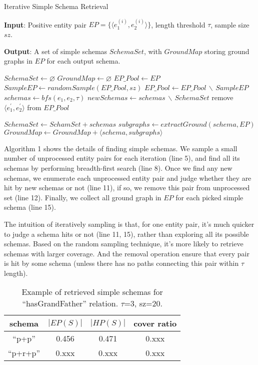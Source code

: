 \begin{algorithm}
\caption{Iterative Simple Schema Retrieval}
\label{alg:bfs}
\textbf{Input}: Positive entity pair $EP=\{\langle e_1^{(i)}, e_2^{(i)} \rangle\}$,
length threshold $\tau$, sample size $sz$.

\textbf{Output}: A set of simple schemas $SchemaSet$, with $GroundMap$ storing ground graphs
in $EP$ for each output schema.
\begin{algorithmic}[1]
\State $SchemaSet \gets \varnothing$
\State $GroundMap \gets \varnothing$
\State $EP\_Pool \gets EP$
	\State $SampleEP \gets randomSample(EP\_Pool, sz)$
	\State $EP\_Pool \gets EP\_Pool\, \backslash\, SampleEP$
		\State $schemas \gets bfs(e_1, e_2, \tau)$
		\State $newSchemas \gets schemas\, \backslash\, SchemaSet$
				\State remove $\langle e_1^{'}, e_2^{'} \rangle$ from $EP\_Pool$
			\EndIf
		\EndFor

		\State $SchemaSet \gets SchamSet + schemas$
	\EndFor
\EndWhile
{}
	\State $subgraphs \gets extractGround(schema, EP)$
	\State $GroundMap \gets GroundMap + \langle schema, subgraphs \rangle$
\EndFor
\Return
\end{algorithmic}
\end{algorithm}

Algorithm 1 shows the details of finding simple schemas.
We sample a small number of unprocessed entity pairs for each iteration (line 5),
and find all its schemas by performing breadth-first search (line 8).
Once we find any new schemas, we enumerate each unprocessed entity pair
and judge whether they are hit by new schemas or not (line 11), if so,
we remove this pair from unprocessed set (line 12).
Finally, we collect all ground graph in $EP$ for each picked simple schema (line 15).

The intuition of iteratively sampling is that, for one entity pair,
it's much quicker to judge a schema hits or not (line 11, 15), rather than exploring
all its possible schemas. Based on the random sampling technique, it's
more likely to retrieve schemas with larger coverage. And the removal operation
ensure that every pair is hit by some schema (unless there has no paths
connecting this pair within $\tau$ length).
\begin{table}[ht]
	\centering
	\caption{Example of retrieved simple schemas for ``hasGrandFather'' relation.
	$\tau$=3, sz=20.}
	\begin{tabular}{|c|c|c|c|}
        \hline
		schema & $|EP(S)|$ & $|HP(S)|$ & cover ratio \\
        \hline
        ``p+p''	& 0.456 & 0.471 & 0.xxx  \\
        \hline
        ``p+r+p''	& 0.xxx & 0.xxx & 0.xxx \\
        \hline
	\end{tabular}%
	\label{tab:simple-schema}%
\end{table}

